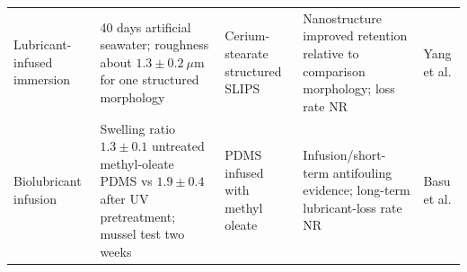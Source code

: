 \begin{table}[t]
\begin{tabularx}{\textwidth}{l l l X X}
Lubricant-infused immersion & 40 days artificial seawater; roughness about $1.3\pm0.2~\mu$m for one structured morphology & Cerium-stearate structured SLIPS & Nanostructure improved retention relative to comparison morphology; loss rate NR & Yang et al. \\
Biolubricant infusion & Swelling ratio $1.3\pm0.1$ untreated methyl-oleate PDMS vs $1.9\pm0.4$ after UV pretreatment; mussel test two weeks & PDMS infused with methyl oleate & Infusion/short-term antifouling evidence; long-term lubricant-loss rate NR & Basu et al. \\
\bottomrule
\end{tabularx}
\end{table}
